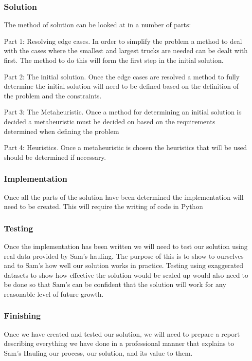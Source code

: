 \documentclass{article}
\begin{document}
\subsubsection{Solution}
The method of solution can be looked at in a number of parts:
	
Part 1: Resolving edge cases. 
In order to simplify the problem a method to deal with the cases where the smallest and largest trucks are needed can be dealt with first. The method to do this will form the first step in the initial solution.

Part 2: The initial solution.
Once the edge cases are resolved a method to fully determine the initial solution will need to be defined based on the definition of the problem and the constraints.

Part 3: The Metaheuristic.
Once a method for determining an initial solution is decided a metaheuristic must be decided on based on the requirements determined when defining the problem

Part 4: Heuristics.
Once a metaheuristic is chosen the heuristics that will be used should be determined if necessary.

\subsubsection{Implementation}
Once all the parts of the solution have been determined the implementation will need to be created. This will require the writing of code in Python

\subsubsection{Testing}
Once the implementation has been written we will need to test our solution using real data provided by Sam's hauling. The purpose of this is to show to ourselves and to Sam's how well our solution works in practice. Testing using exaggerated datasets to show how effective the solution would be scaled up would also need to be done so that Sam's can be confident that the solution will work for any reasonable level of future growth.

\subsubsection{Finishing}
Once we have created and tested our solution, we will need to prepare a report describing everything we have done in a professional manner that explains to Sam's Hauling our process, our solution, and its value to them.
\end{document}
